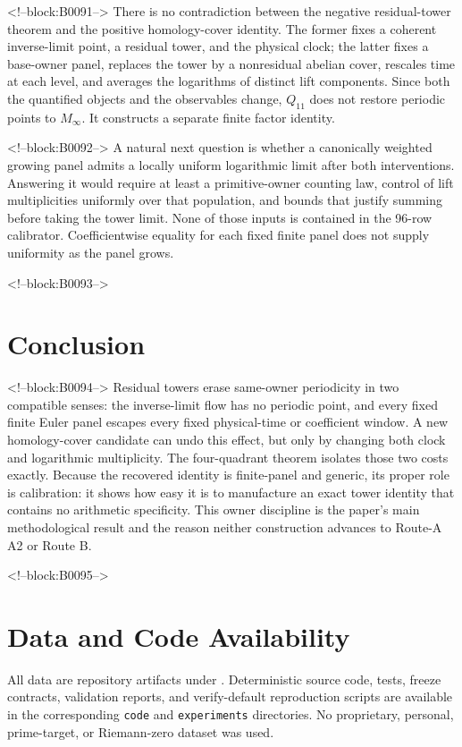 \documentclass[11pt]{article}
\theoremstyle{definition}
\theoremstyle{remark}
\begin{document}
<!--block:B0091-->
There is no contradiction between the negative residual-tower theorem and the positive homology-cover identity. The former fixes a coherent inverse-limit point, a residual tower, and the physical clock; the latter fixes a base-owner panel, replaces the tower by a nonresidual abelian cover, rescales time at each level, and averages the logarithms of distinct lift components. Since both the quantified objects and the observables change, $Q_{11}$ does not restore periodic points to $M_\infty$. It constructs a separate finite factor identity.

<!--block:B0092-->
A natural next question is whether a canonically weighted growing panel admits a locally uniform logarithmic limit after both interventions. Answering it would require at least a primitive-owner counting law, control of lift multiplicities uniformly over that population, and bounds that justify summing before taking the tower limit. None of those inputs is contained in the 96-row calibrator. Coefficientwise equality for each fixed finite panel does not supply uniformity as the panel grows.

<!--block:B0093-->
\section{Conclusion}

<!--block:B0094-->
Residual towers erase same-owner periodicity in two compatible senses: the inverse-limit flow has no periodic point, and every fixed finite Euler panel escapes every fixed physical-time or coefficient window. A new homology-cover candidate can undo this effect, but only by changing both clock and logarithmic multiplicity. The four-quadrant theorem isolates those two costs exactly. Because the recovered identity is finite-panel and generic, its proper role is calibration: it shows how easy it is to manufacture an exact tower identity that contains no arithmetic specificity. This owner discipline is the paper's main methodological result and the reason neither construction advances to Route-A A2 or Route B.

<!--block:B0095-->
\section*{Data and Code Availability}
All data are repository artifacts under . Deterministic source code, tests, freeze contracts, validation reports, and verify-default reproduction scripts are available in the corresponding \texttt{code} and \texttt{experiments} directories. No proprietary, personal, prime-target, or Riemann-zero dataset was used.
\end{document}
